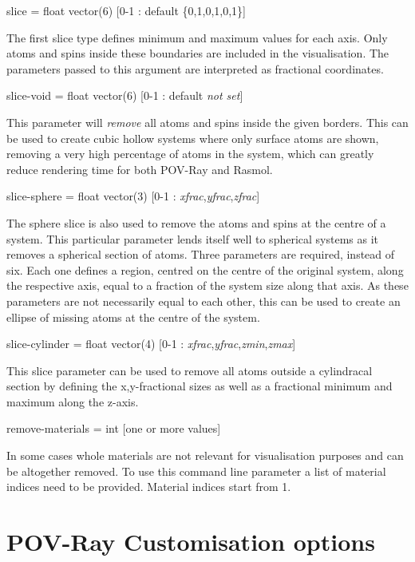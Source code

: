 {\zicf slice = float vector(6) [0-1 : default \{0,1,0,1,0,1\}]} The first slice type defines minimum and maximum values for each axis. Only atoms and spins inside these boundaries are included in the visualisation. The parameters passed to this argument are interpreted as fractional coordinates.

{\zicf slice-void = float vector(6) [0-1 : default \textit{not set}]} This parameter will \textit{remove} all atoms and spins inside the given borders. This can be used to create cubic hollow systems where only surface atoms are shown,  removing a very high percentage of atoms in the system, which can greatly reduce rendering time for both POV-Ray and Rasmol. 

{\zicf slice-sphere = float vector(3) [0-1 : \textit{xfrac},\textit{yfrac},\textit{zfrac}]} The sphere slice is also used to remove the atoms and spins at the centre of a system. This particular parameter lends itself well to spherical systems as it removes a spherical section of atoms. Three parameters are required, instead of six. Each one defines a region, centred on the centre of the original system, along the respective axis, equal to a fraction of the system size along that axis. As these parameters are not necessarily equal to each other, this can be used to create an ellipse of missing atoms at the centre of the system.

{\zicf slice-cylinder = float vector(4) [0-1 : \textit{xfrac},\textit{yfrac},\textit{zmin},\textit{zmax}]} This slice parameter can be used to remove all atoms outside a cylindracal section by defining the x,y-fractional sizes as well as a fractional minimum and maximum along the z-axis.

{\zicf remove-materials = int [one or more values] } In some cases whole materials are not relevant for visualisation purposes and can be altogether removed. To use this command line parameter a list of material indices need to be provided. Material indices start from 1.

\section*{POV-Ray Customisation options}

